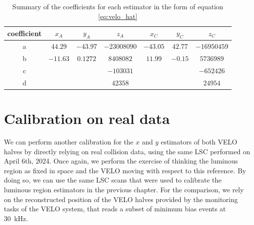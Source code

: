 \begin{table}
\centering
\begin{tabular}{c|c|c|c|c|c|c}
coefficient  & $x_A$   & $y_A$   & $z_A$      & $x_C$   & $y_C$  & $z_C$      \\\hline
a & $44.29$  & $-43.97$ &  $-23008090$    & $-43.05$ & $42.77$ &   $-16950459$   \\
b & $-11.63$ & $0.1272$ & $8408082$   & $11.99$  & $-0.15$ &  $5736989$ \\
c &        &        & $-103031$   &        &       &  $-652426 $  \\
d &        &        &  $42358$ &        &       & $24954$
\end{tabular}
\caption{Summary of the coefficients for each estimator in the form of equation \eqref{eq:velo_hat}}\label{tab:coefficients}
\end{table}

\section{Calibration on real data}
We can perform another calibration for the $x$ and $y$ estimators of both VELO halves by directly relying on real collision data, using the same LSC performed on April 6th, 2024. 
Once again, we perform the exercise of thinking the luminous region as fixed in space and the VELO moving with respect to this reference. By doing so, we can use the same LSC scans that were used to calibrate the luminous region estimators in the previous chapter. For the comparison, we rely on the reconstructed position of the VELO halves provided by the monitoring tasks of the VELO system, that reads a subset of minimum bias events at \SI{30}{\kilo\hertz}. 

